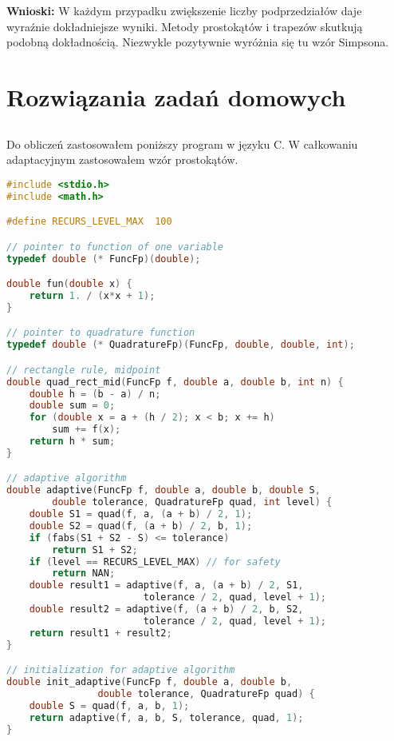 \documentclass{article}
\begin{document}
\noindent
\textbf{Wnioski:} W każdym przypadku zwiększenie liczby podprzedziałów daje wyraźnie dokładniejsze wyniki. Metody prostokątów i trapezów skutkują podobną dokładnością. Niezwykle pozytywnie wyróżnia się tu wzór Simpsona.

\newpage

\subsection{}

\newpage

\section{Rozwiązania zadań domowych}

\subsection{}
Do obliczeń zastosowałem poniższy program w języku C. W całkowaniu adaptacyjnym zastosowałem wzór prostokątów.

\begin{lstlisting}[language=C]
#include <stdio.h>
#include <math.h>

#define RECURS_LEVEL_MAX  100

// pointer to function of one variable
typedef double (* FuncFp)(double);

double fun(double x) {
    return 1. / (x*x + 1);
}

// pointer to quadrature function
typedef double (* QuadratureFp)(FuncFp, double, double, int);

// rectangle rule, midpoint
double quad_rect_mid(FuncFp f, double a, double b, int n) {
    double h = (b - a) / n;
    double sum = 0;
    for (double x = a + (h / 2); x < b; x += h)
        sum += f(x);
    return h * sum;
}

// adaptive algorithm
double adaptive(FuncFp f, double a, double b, double S,
        double tolerance, QuadratureFp quad, int level) {
    double S1 = quad(f, a, (a + b) / 2, 1);
    double S2 = quad(f, (a + b) / 2, b, 1);
    if (fabs(S1 + S2 - S) <= tolerance)
        return S1 + S2;
    if (level == RECURS_LEVEL_MAX) // for safety
        return NAN;
    double result1 = adaptive(f, a, (a + b) / 2, S1,
                        tolerance / 2, quad, level + 1);
    double result2 = adaptive(f, (a + b) / 2, b, S2,
                        tolerance / 2, quad, level + 1);
    return result1 + result2;
}

// initialization for adaptive algorithm
double init_adaptive(FuncFp f, double a, double b,
                double tolerance, QuadratureFp quad) {
    double S = quad(f, a, b, 1);
    return adaptive(f, a, b, S, tolerance, quad, 1);
}
\end{lstlisting}
\end{document}
